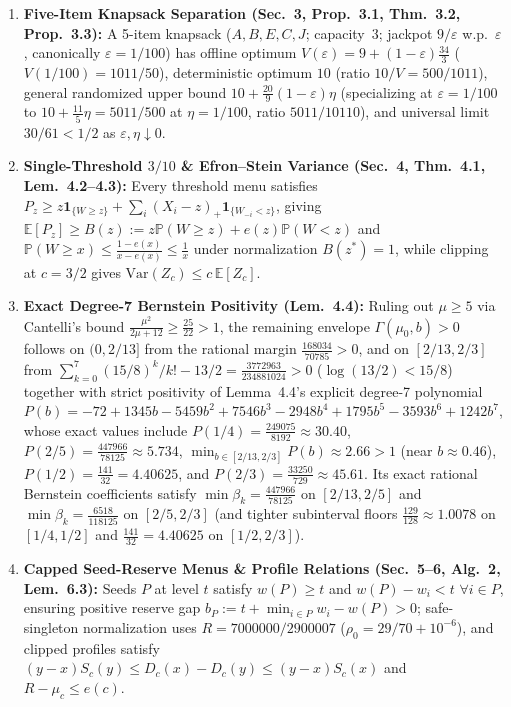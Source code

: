 \documentclass[10pt,twocolumn]{article}
\begin{document}
\begin{enumerate}[leftmargin=*,nosep]
  \item \textbf{Five-Item Knapsack Separation (Sec.~3, Prop.~3.1, Thm.~3.2, Prop.~3.3):} A 5-item knapsack ($A,B,E,C,J$; capacity~3; jackpot $9/\varepsilon$ w.p.\ $\varepsilon$, canonically $\varepsilon=1/100$) has offline optimum $V(\varepsilon) = 9 + (1-\varepsilon)\frac{34}{3}$ ($V(1/100) = 1011/50$), deterministic optimum $10$ (ratio $10/V = 500/1011$), general randomized upper bound $10 + \frac{20}{9}(1-\varepsilon)\eta$ (specializing at $\varepsilon=1/100$ to $10+\frac{11}{5}\eta = 5011/500$ at $\eta=1/100$, ratio $5011/10110$), and universal limit $30/61 < 1/2$ as $\varepsilon, \eta \downarrow 0$.
  \item \textbf{Single-Threshold $3/10$ \& Efron--Stein Variance (Sec.~4, Thm.~4.1, Lem.~4.2--4.3):} Every threshold menu satisfies $P_z \ge z\mathbf{1}_{\{W\ge z\}} + \sum_i(X_i - z)_+\mathbf{1}_{\{W_{-i}<z\}}$, giving $\mathbb{E}[P_z] \ge B(z) := z\mathbb{P}(W\ge z) + e(z)\mathbb{P}(W<z)$ and $\mathbb{P}(W\ge x) \le \frac{1-e(x)}{x-e(x)} \le \frac{1}{x}$ under normalization $B(z^*)=1$, while clipping at $c=3/2$ gives $\mathrm{Var}(Z_c) \le c\,\mathbb{E}[Z_c]$.
  \item \textbf{Exact Degree-7 Bernstein Positivity (Lem.~4.4):} Ruling out $\mu \ge 5$ via Cantelli's bound $\frac{\mu^2}{2\mu+12} \ge \frac{25}{22} > 1$, the remaining envelope $\Gamma(\mu_0, b) > 0$ follows on $(0, 2/13]$ from the rational margin $\frac{168034}{70785} > 0$, and on $[2/13, 2/3]$ from $\sum_{k=0}^7 (15/8)^k/k! - 13/2 = \frac{3772963}{234881024} > 0$ ($\log(13/2) < 15/8$) together with strict positivity of Lemma~4.4's explicit degree-7 polynomial $P(b) = -72 + 1345 b - 5459 b^2 + 7546 b^3 - 2948 b^4 + 1795 b^5 - 3593 b^6 + 1242 b^7$, whose exact values include $P(1/4)=\frac{249075}{8192}\approx 30.40$, $P(2/5)=\frac{447966}{78125}\approx 5.734$, $\min_{b\in[2/13,2/3]} P(b) \approx 2.66 > 1$ (near $b\approx 0.46$), $P(1/2)=\frac{141}{32}=4.40625$, and $P(2/3)=\frac{33250}{729}\approx 45.61$. Its exact rational Bernstein coefficients satisfy $\min\beta_k = \frac{447966}{78125}$ on $[2/13,2/5]$ and $\min\beta_k = \frac{6518}{118125}$ on $[2/5,2/3]$ (and tighter subinterval floors $\frac{129}{128}\approx 1.0078$ on $[1/4,1/2]$ and $\frac{141}{32}=4.40625$ on $[1/2,2/3]$).
  \item \textbf{Capped Seed-Reserve Menus \& Profile Relations (Sec.~5--6, Alg.~2, Lem.~6.3):} Seeds $P$ at level $t$ satisfy $w(P) \ge t$ and $w(P) - w_i < t$ $\forall i\in P$, ensuring positive reserve gap $b_P := t + \min_{i\in P} w_i - w(P) > 0$; safe-singleton normalization uses $R = 7000000/2900007$ ($\rho_0 = 29/70 + 10^{-6}$), and clipped profiles satisfy $(y-x)S_c(y) \le D_c(x)-D_c(y) \le (y-x)S_c(x)$ and $R-\mu_c \le e(c)$.
\end{enumerate}
\end{document}
